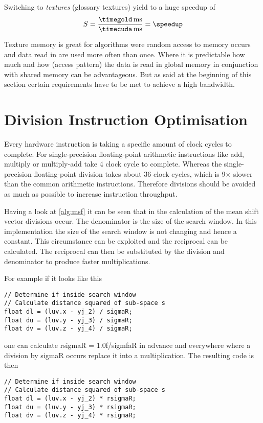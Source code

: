 Switching to \emph{textures} (glossary textures) yield to a huge speedup of 
\fpDiv{\speedup}{\timegold}{\timecuda}
\begin{equation*}\label{eq:speedup2}
	S = \frac{\unit[\timegold]{ms}}{\unit[\timecuda]{ms}} = \speedup
\end{equation*}

Texture memory is great for algorithms were random access to memory occurs and
data read in are used more often than once. Where it is predictable how much and 
how (access pattern) the data is read in global memory in conjunction with shared
memory can be advantageous. But as said at the beginning of this section certain
requirements have to be met to achieve a high bandwidth. 

\section{Division Instruction Optimisation}
\label{sec:expensive_divisions}
Every hardware instruction is taking a specific amount of clock cycles to complete. 
For single-precision floating-point arithmetic instructions like add, multiply
or multiply-add take 4 clock cycle to complete. Whereas the single-precision
floating-point division takes about 36 clock cycles, which is 9$\times$ slower 
than the common arithmetic instructions. Therefore divisions should be avoided
as much as possible to increase instruction throughput. 


Having a look at \autoref{alg:msf} it can be seen that in the calculation of the
mean shift vector divisions occur. The denominator is the size of the search
window. In this implementation the size of the search window is not changing and
hence a constant. This circumstance can be exploited and the reciprocal can be
calculated. The reciprocal can then be substituted by the division and denominator
to produce faster multiplications.

For example if it looks like this
\begin{lstlisting}[caption=Expensive division, label=lst:division]
// Determine if inside search window
// Calculate distance squared of sub-space s
float dl = (luv.x - yj_2) / sigmaR;               
float du = (luv.y - yj_3) / sigmaR;               
float dv = (luv.z - yj_4) / sigmaR;
\end{lstlisting}
one can calculate \textsf{rsigmaR} = 1.0f/\textsf{sigmfaR} in advance and everywhere where a
division by \textsf{sigmaR} occurs replace it into a multiplication. The
resulting code is then
\begin{lstlisting}[caption=Division turned into fast multiplication, label=lst:precalcdivision]
// Determine if inside search window
// Calculate distance squared of sub-space s
float dl = (luv.x - yj_2) * rsigmaR;               
float du = (luv.y - yj_3) * rsigmaR;               
float dv = (luv.z - yj_4) * rsigmaR;
\end{lstlisting}

